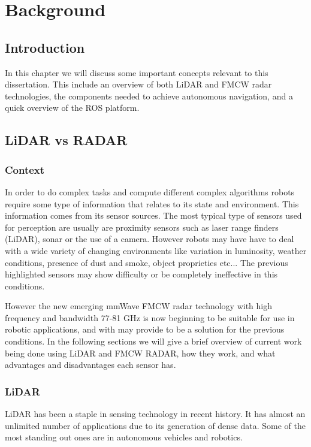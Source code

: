 \chapter{Background} \label{ch:Concepts}

\section{Introduction}
In this chapter we will discuss some important concepts relevant to this dissertation. This include an overview of both \ac{LiDAR} and \ac{FMCW} radar technologies, the components needed to achieve autonomous navigation,  and a quick overview of the \ac{ROS} platform.

\section{\ac{LiDAR} vs \ac{RADAR}}
\subsection{Context}
In order to do complex tasks and compute different complex algorithms robots require some type of information that relates to its state and environment. This information comes from its sensor sources.
The most typical type of sensors used for perception are usually are proximity sensors such as laser range finders (\ac{LiDAR}), sonar or the use of a camera. However robots may have have to deal with a wide variety of changing environments like variation in luminosity, weather conditions, presence of dust and smoke, object proprieties etc... The previous highlighted sensors may show difficulty or be completely ineffective in this conditions.


However the new emerging \ac{mmWave} \ac{FMCW} radar technology with high frequency and bandwidth 77-81 GHz is now beginning to be suitable for use in robotic applications, and with may provide to be a solution for the previous conditions. In the following  sections we will give a brief overview of current work being done using \ac{LiDAR} and \ac{FMCW} \ac{RADAR}, how they work, and what advantages and disadvantages each sensor has.

\subsection{LiDAR}
\ac{LiDAR} has been a staple in sensing technology in recent history. It has almost an  unlimited  number of applications \cite{lidar100uses} due to its generation of dense data. Some of the most standing out ones are in autonomous vehicles and robotics. 
